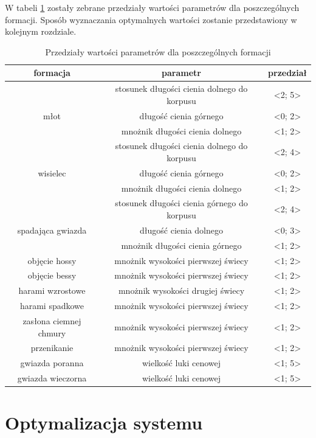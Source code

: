 \documentclass[pdflatex,11pt]{aghdpl}
\begin{document}
W tabeli \ref{parametry_przedzialy} zostały zebrane przedziały wartości parametrów dla poszczególnych formacji. Sposób wyznaczania optymalnych wartości zostanie przedstawiony w kolejnym rozdziale.  
\begin{table}[H]
\begin{center}
\begin{tabular}{|c|c|c|}
\hline 
formacja & parametr & przedział \\
\hline
 & stosunek długości cienia dolnego do korpusu & <2; 5>\\
młot & długość cienia górnego & <0; 2>\\
& mnożnik długości cienia dolnego & <1; 2>\\
\hline
 & stosunek długości cienia dolnego do korpusu & <2; 4>\\
wisielec & długość cienia górnego & <0; 2>\\
& mnożnik długości cienia dolnego & <1; 2>\\
\hline
 & stosunek długości cienia górnego do korpusu & <2; 4>\\
spadająca gwiazda & długość cienia dolnego & <0; 3>\\
& mnożnik długości cienia górnego & <1; 2>\\
\hline
objęcie hossy & mnożnik wysokości pierwszej świecy & <1; 2>\\
\hline
objęcie bessy & mnożnik wysokości pierwszej świecy & <1; 2>\\
\hline
harami wzrostowe & mnożnik wysokości drugiej świecy & <1; 2>\\
\hline
harami spadkowe & mnożnik wysokości pierwszej świecy & <1; 2>\\
\hline
zasłona ciemnej chmury & mnożnik wysokości pierwszej świecy & <1; 2>\\
\hline
przenikanie & mnożnik wysokości pierwszej świecy & <1; 2>\\
\hline
gwiazda poranna & wielkość luki cenowej & <1; 5>\\
\hline
gwiazda wieczorna & wielkość luki cenowej & <1; 5>\\
\hline
\end{tabular} 
\caption{Przedziały wartości parametrów dla poszczególnych formacji}
\label{parametry_przedzialy}
\end{center}
\end{table}

\chapter{Optymalizacja systemu}
\label{chap:optymalizacja}
\end{document}
